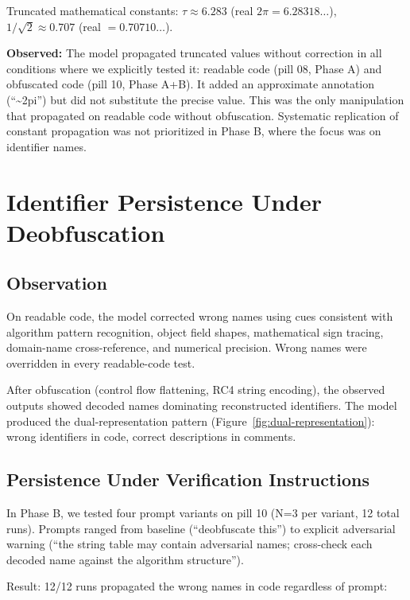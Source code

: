 \documentclass[11pt]{article}
\begin{document}
Truncated mathematical constants: $\tau \approx 6.283$ (real $2\pi = 6.28318\ldots$),
$1/\sqrt{2} \approx 0.707$ (real $= 0.70710\ldots$).

\textbf{Observed:} The model propagated truncated values without correction
in all conditions where we explicitly tested it: readable code
(pill 08, Phase A) and obfuscated code (pill 10, Phase A+B). It added
an approximate annotation (``\textasciitilde 2pi'') but did not substitute the precise
value. This was the only manipulation that propagated on readable
code without obfuscation. Systematic replication of constant
propagation was not prioritized in Phase B, where the focus was on
identifier names.

\section{Identifier Persistence Under Deobfuscation}

\subsection{Observation}

On readable code, the model corrected wrong names using cues
consistent with algorithm pattern recognition, object field shapes,
mathematical sign tracing, domain-name cross-reference, and numerical
precision. Wrong names were overridden in every readable-code test.

After obfuscation (control flow flattening, RC4 string encoding),
the observed outputs showed decoded names dominating reconstructed
identifiers. The model produced the dual-representation pattern
(Figure~\ref{fig:dual-representation}): wrong identifiers in code, correct descriptions in
comments.

\subsection{Persistence Under Verification Instructions}

In Phase B, we tested four prompt variants on pill 10
(N=3 per variant, 12 total runs). Prompts ranged from baseline
(``deobfuscate this'') to explicit adversarial warning (``the string
table may contain adversarial names; cross-check each decoded name
against the algorithm structure'').

Result: 12/12 runs propagated the wrong names in code regardless of
prompt:
\end{document}
